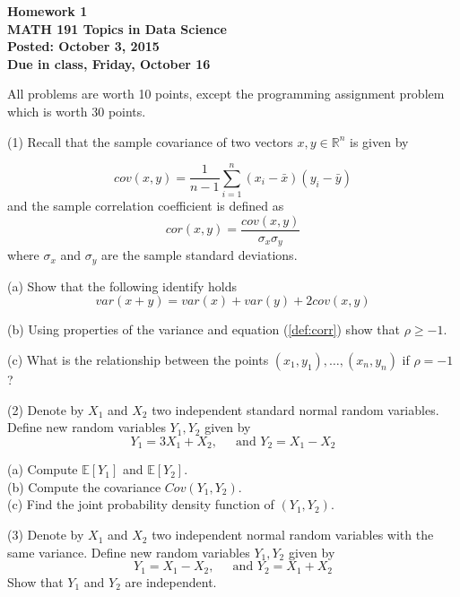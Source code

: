 \documentclass[12pt]{article}
\begin{document}
\begin{center}
{\bf Homework 1}\\
{\bf MATH 191 Topics in Data Science}\\
{\bf Posted: October 3, 2015}\\
{\bf Due in class, Friday, October 16} \\
\end{center}

All problems are worth 10 points, except the programming assignment problem which is worth 30 points.

(1)  Recall that the sample covariance of two vectors 
$x,y \in \mathbb{R}^n$ is given by 

$$ cov(x,y)=\frac{1}{n-1} \sum_{i=1}^{n} ( x_i - \bar{x})( y_i - \bar{y})$$
and the sample correlation coefficient is defined as
\begin{equation}
	 cor(x,y) = \frac{cov(x,y)}{\sigma_x \sigma_y}
	 \label{def:corr}
\end{equation}
where $\sigma_x$ and $\sigma_y$ are the sample standard deviations.

(a) Show that the following identify holds
$$ var(x+y) = var(x) +  var(y) + 2 cov(x,y) $$

(b) Using properties of the variance and equation (\ref{def:corr}) show that $\rho \geq -1$.

(c) What is the relationship between the points $(x_1, y_1), \ldots, (x_n,y_n)$ if $\rho = -1$ ?

\vspace{6mm}


(2) Denote by $X_1$ and $X_2$ two independent standard normal random variables. Define new random variables $Y_1,Y_2$ given by
$$ Y_1 = 3 X_1 + X_2, \;\;\;\;  \mbox{ and } Y_2 = X_1 - X_2 $$

(a) Compute $\mathbb{E}[Y_1]$ and $\mathbb{E}[Y_2]$. \\
(b) Compute the covariance $Cov(Y_1,Y_2)$. \\
(c) Find the joint probability density function of $(Y_1,Y_2)$. \\

\vspace{6mm}

(3)  Denote by $X_1$ and $X_2$ two independent normal random variables with the same variance. Define new random variables $Y_1,Y_2$ given by
$$ Y_1 = X_1 - X_2, \;\;\;\;  \mbox{ and } Y_2 = X_1 + X_2 $$
Show that $Y_1$ and $Y_2$ are independent.

\vspace{6mm}
\end{document}
